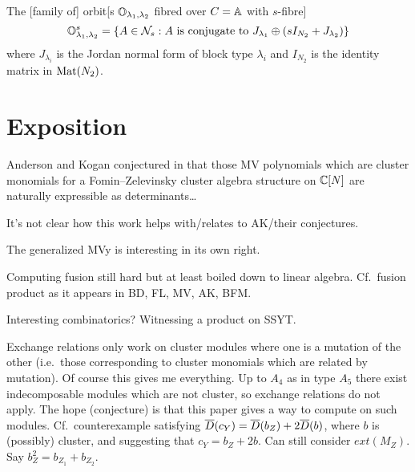 \documentclass{article}
\begin{document}

The [family of] orbit[s $\OO_{\lambda_1,\lambda_2}$ fibred over $C = \AA$ with $s$-fibre]  
\begin{equation}
    \OO_{\lambda_1,\lambda_2}^s = \{A \in \cN_s : A \text{ is conjugate to } J_{\lambda_1}\oplus (sI_{N_2} + J_{\lambda_2})\}
\end{equation}
where $J_{\lambda_i}$ is the Jordan normal form of block type $\lambda_i$ and $I_{N_2}$ is the identity matrix in $\mat(N_2)$.
% 
\section{Exposition}

Anderson and Kogan conjectured in \cite{anderson2006algebra}  that those MV polynomials which are cluster monomials for a Fomin--Zelevinsky cluster algebra structure on $\CC[N]$ are naturally expressible as determinants\dots

It's not clear how this work helps with/relates to AK/their conjectures.

The generalized MVy is interesting in its own right. 

Computing fusion still hard but at least boiled down to linear algebra. Cf.\ fusion product as it appears in BD, FL, MV, AK, BFM.

Interesting combinatorics? Witnessing a product on SSYT.

Exchange relations only work on cluster modules where one is a mutation of the other (i.e.\ those corresponding to cluster monomials which are related by mutation). Of course this gives me everything. Up to $A_4$ as in type $A_5$ there exist indecomposable modules which are not cluster, so exchange relations do not apply. The hope (conjecture) is that this paper gives a way to compute on such modules. Cf.\ counterexample satisfying $\barD(c_Y) = \barD(b_Z) + 2\barD(b)$, where $b$ is (possibly) cluster, and suggesting that $c_Y = b_Z + 2b$. Can still consider $ext(M_Z)$. Say $b_Z^2 = b_{Z_1} + b_{Z_2}$. 
\end{document}
